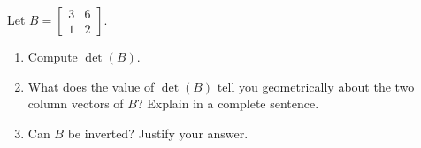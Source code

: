 \documentclass[10pt]{article}
\begin{document}
\vspace{0.1in}

\begin{tcolorbox}[colback=white, colframe=black!40,
    title=\textbf{Tier E --- Extension},
    fonttitle=\bfseries, arc=2mm, left=3mm, right=3mm, top=2mm, bottom=2mm]
Let $B = \begin{bmatrix}3&6\\1&2\end{bmatrix}$.

\begin{enumerate}[leftmargin=1.5em, itemsep=8pt]
    \item Compute $\det(B)$.
          \vspace{0.5in}

    \item What does the value of $\det(B)$ tell you geometrically about the two column
          vectors of $B$? Explain in a complete sentence.
          \writeline
          \writeline

    \item Can $B$ be inverted? Justify your answer.
          \writeline
          \writeline
\end{enumerate}
\end{tcolorbox}
\end{document}
